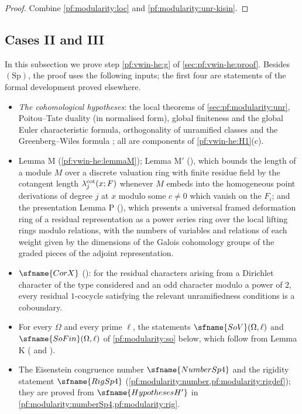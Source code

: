 \begin{proof}
Combine \cref{pf:modularity:loc} and \cref{pf:modularity:unr-kisin}.
\end{proof}

\subsection{Cases II and III}\label{sec:pf:modularity:count23}

In this subsection we prove step \ref{pf:vwin-he:g} of \cref{sec:pf:vwin-he:proof}. Besides $(\mathrm{Sp})$, the proof
uses the following inputs; the first four are statements of the formal development proved elsewhere.
\begin{itemize}
\item \emph{The cohomological hypotheses}: the local theorems of \cref{sec:pf:modularity:unr}, Poitou--Tate duality (in
normalised form), global finiteness and the global Euler characteristic formula, orthogonality of unramified classes
and the Greenberg--Wiles formula \cite{Wiles1995}; all are components of \ref{pf:vwin-he:H1}(c).
\item Lemma M (\cref{pf:vwin-he:lemmaM}); Lemma M$'$ (), which bounds the
length of a module $M$ over a discrete valuation ring with finite residue field by the cotangent length
$\lambda^{\mathrm{cot}}_j(x;F)$ whenever $M$ embeds into the homogeneous point derivations of degree $j$ at $x$ modulo some
$c\ne0$ which vanish on the $F_i$; and the presentation Lemma P (), which
presents a universal framed deformation ring of a residual representation as a power series ring over the local
lifting rings modulo relations, with the numbers of variables and relations of each weight given by the dimensions of
the Galois cohomology groups of the graded pieces of the adjoint representation.
\item $\sfname{CorX}$ (): for the residual characters arising from a Dirichlet
character of the type considered and an odd character modulo a power of $2$, every residual $1$-cocycle satisfying
the relevant unramifiedness conditions is a coboundary.
\item For every $\Omega$ and every prime $\ell$, the statements $\sfname{SoV}(\Omega,\ell)$ and
$\sfname{SoFin}(\Omega,\ell)$ of \cref{pf:modularity:so} below, which follow from Lemma K
( and ).
\item The Eisenstein congruence number $\sfname{NumberSp4}$ and the rigidity statement $\sfname{RigSp4}$
(\cref{pf:modularity:number,pf:modularity:rigdef}); they are proved from $\sfname{HypothesesH'}$ in
\cref{pf:modularity:numberSp4,pf:modularity:rig}.
\end{itemize}

